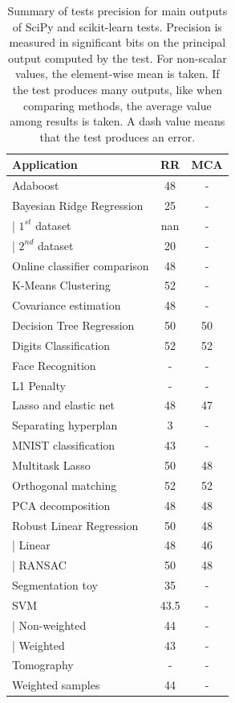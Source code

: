 \documentclass[11pt]{article}
\begin{document}
\begin{table}
\begin{subfigure}[t]{.5\linewidth}
\begin{tabular}{|l|c|c|}
    \hline 
    Application & RR & MCA \\
    \hline
    Adaboost & 48 & - \\
    Bayesian Ridge Regression  & 25 & -  \\
    | $1^{st}$ dataset & nan & - \\
    | $2^{nd}$ dataset & 20 & - \\
    Online classifier comparison & 48 & -  \\
    K-Means Clustering  & 52 & -   \\
    Covariance estimation  & 48 & -   \\
    Decision Tree Regression & 50 & 50  \\
    Digits Classification  & 52 & 52 \\
    Face Recognition  & - & - \\
    L1 Penalty  & - & -   \\
    Lasso and elastic net  & 48 & 47  \\
    Separating hyperplan  & 3 & -  \\
    MNIST classification  & 43 & - \\
    Multitask Lasso  & 50 & 48   \\
    Orthogonal matching & 52 & 52  \\
    PCA decomposition  & 48 & 48   \\
    Robust Linear Regression  & 50 & 48   \\
    | Linear & 48 & 46 \\
    | RANSAC & 50 & 48 \\
    Segmentation toy  & 35 & - \\
    SVM  & 43.5 &  -  \\
    | Non-weighted & 44 & - \\
    | Weighted & 43 & - \\
    Tomography  & - & -  \\
    Weighted samples  & 44 & -   \\
    \hline
    \end{tabular}
\end{subfigure}
    \caption{Summary of tests precision for main outputs of SciPy and scikit-learn tests. Precision is measured in significant bits on the principal output computed by the test.
    For non-scalar values, the element-wise mean is taken. If the test produces many outputs, like when comparing methods, the average value among results is taken.  
    A dash value means that the test produces an error. }
    \label{tab:pytracer_test_precision_summary}
\end{table}
\end{document}
